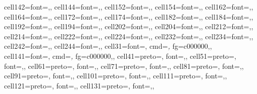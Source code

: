 \documentclass[
  jou,
  floatsintext,
  longtable,
  nolmodern,
  notxfonts,
  notimes,
  colorlinks=true,linkcolor=blue,citecolor=blue,urlcolor=blue]{apa7}
\newenvironment{twocolumntable}%
{%
\begin{table}[!htbp]%
\onecolumn%
}%
{%
\twocolumn%
\end{table}%
}%
\begin{document}
\begin{twocolumntable}
\begin{table}
{\begin{talltblr}
{cell{14}{2}={}{font=\fontsize{0.8em}{1.1em}\selectfont,},
cell{14}{4}={}{font=\fontsize{0.8em}{1.1em}\selectfont,},
cell{15}{2}={}{font=\fontsize{0.8em}{1.1em}\selectfont,},
cell{15}{4}={}{font=\fontsize{0.8em}{1.1em}\selectfont,},
cell{16}{2}={}{font=\fontsize{0.8em}{1.1em}\selectfont,},
cell{16}{4}={}{font=\fontsize{0.8em}{1.1em}\selectfont,},
cell{17}{2}={}{font=\fontsize{0.8em}{1.1em}\selectfont,},
cell{17}{4}={}{font=\fontsize{0.8em}{1.1em}\selectfont,},
cell{18}{2}={}{font=\fontsize{0.8em}{1.1em}\selectfont,},
cell{18}{4}={}{font=\fontsize{0.8em}{1.1em}\selectfont,},
cell{19}{2}={}{font=\fontsize{0.8em}{1.1em}\selectfont,},
cell{19}{4}={}{font=\fontsize{0.8em}{1.1em}\selectfont,},
cell{20}{2}={}{font=\fontsize{0.8em}{1.1em}\selectfont,},
cell{20}{4}={}{font=\fontsize{0.8em}{1.1em}\selectfont,},
cell{21}{2}={}{font=\fontsize{0.8em}{1.1em}\selectfont,},
cell{21}{4}={}{font=\fontsize{0.8em}{1.1em}\selectfont,},
cell{22}{2}={}{font=\fontsize{0.8em}{1.1em}\selectfont,},
cell{22}{4}={}{font=\fontsize{0.8em}{1.1em}\selectfont,},
cell{23}{2}={}{font=\fontsize{0.8em}{1.1em}\selectfont,},
cell{23}{4}={}{font=\fontsize{0.8em}{1.1em}\selectfont,},
cell{24}{2}={}{font=\fontsize{0.8em}{1.1em}\selectfont,},
cell{24}{4}={}{font=\fontsize{0.8em}{1.1em}\selectfont,},
cell{3}{1}={}{font=\fontsize{0.8em}{1.1em}\selectfont, cmd=\textit, fg=c000000,},
cell{14}{1}={}{font=\fontsize{0.8em}{1.1em}\selectfont, cmd=\textit, fg=c000000,},
cell{4}{1}={}{preto={\hspace{1em}}, font=\fontsize{0.8em}{1.1em}\selectfont,},
cell{5}{1}={}{preto={\hspace{1em}}, font=\fontsize{0.8em}{1.1em}\selectfont,},
cell{6}{1}={}{preto={\hspace{1em}}, font=\fontsize{0.8em}{1.1em}\selectfont,},
cell{7}{1}={}{preto={\hspace{1em}}, font=\fontsize{0.8em}{1.1em}\selectfont,},
cell{8}{1}={}{preto={\hspace{1em}}, font=\fontsize{0.8em}{1.1em}\selectfont,},
cell{9}{1}={}{preto={\hspace{1em}}, font=\fontsize{0.8em}{1.1em}\selectfont,},
cell{10}{1}={}{preto={\hspace{1em}}, font=\fontsize{0.8em}{1.1em}\selectfont,},
cell{11}{1}={}{preto={\hspace{1em}}, font=\fontsize{0.8em}{1.1em}\selectfont,},
cell{12}{1}={}{preto={\hspace{1em}}, font=\fontsize{0.8em}{1.1em}\selectfont,},
cell{13}{1}={}{preto={\hspace{1em}}, font=\fontsize{0.8em}{1.1em}\selectfont,},
}
\end{talltblr}}
\end{table}
\end{twocolumntable}
\end{document}
